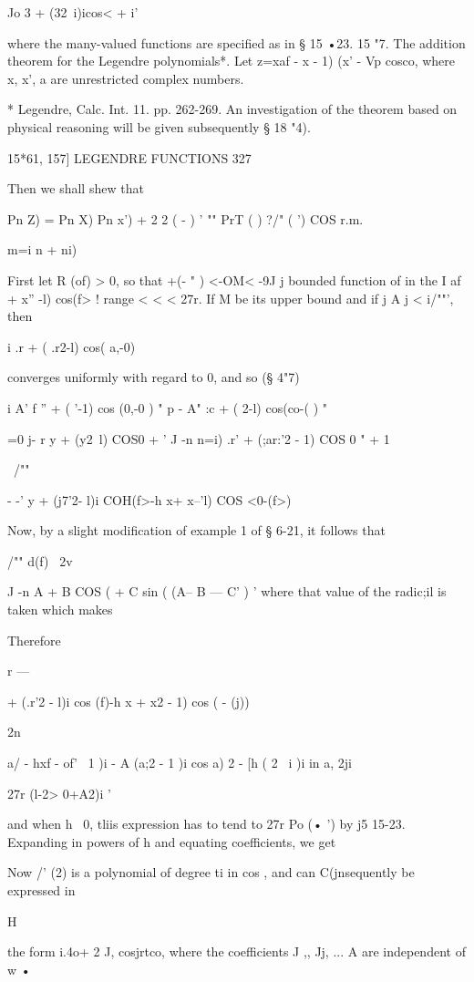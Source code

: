 {{{Jo 3 + (32\ i)icos< + i'

where the many-valued functions are specified as in § 15 •23. 15 "7.
The addition theorem for the Legendre polynomials*. Let z=xaf - x - 1)
(x' - Vp cosco, where x, x', a are unrestricted complex numbers.

* Legendre, Calc. Int. 11. pp. 262-269. An investigation of the
theorem based on physical reasoning will be given subsequently § 18
"4).

15*61, 157] LEGENDRE FUNCTIONS 327

Then we shall shew that

Pn Z) = Pn X) Pn x') + 2 2 ( - ) ' "" PrT ( ) ?/" ( ') COS r.m.

m=i n + ni) \

First let R (of) > 0, so that +(- " ) <-OM< -9J j bounded function of
in the I af + x'' -l) cos(f> ! range < < < 27r. If M be its upper
bound and if j A j < i/""', then

i .r + ( .r2-l) cos( a,-0)

converges uniformly with regard to 0, and so (§ 4"7)

i A' f '' + ( '-1) cos (0,-0 ) " p - A" :c + ( 2-l) cos(co-( ) "

 =0 j- r y + (y2\ l) COS0 + ' J -n n=i) .r' + (;ar:'2 - 1) COS 0 " + 1

\ /""

- -' y + (j7'2- l)i COH(f>-h x+ x--'l) COS <0-(f>)

Now, by a slight modification of example 1 of § 6-21, it follows that

/"" d(f) \ 2v

J -n A + B COS ( + C sin ( (A-- B — C' ) ' where that value of the
radic;il is taken which makes

Therefore

r —

+ (.r'2 - l)i cos (f)-h x + x2 - 1) cos ( - (j))

2n

  a/ - hxf - of' \ 1 )i - A (a;2 - 1 )i cos a) 2 - [h ( 2 \ i )i in a,
2ji

27r (l-2> 0+A2)i '

and when h~ 0, tliis expression has to tend to 27r Po (• ') by j5
15-23. Expanding in powers of h and equating coefficients, we get

Now /' (2) is a polynomial of degree ti in cos , and can C(jnsequently
be expressed in

H

the form i.4o+ 2 J, cosjrtco, where the coefficients J ,, Jj, ... A
are independent of w •

}}}
